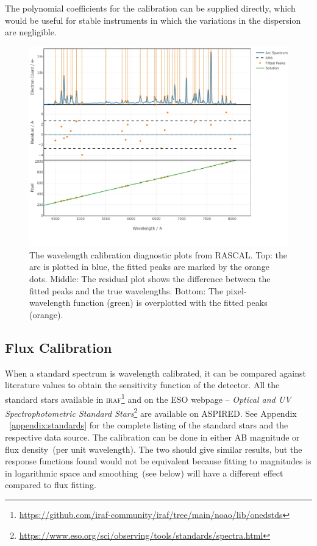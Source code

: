 \documentclass[fleqn,usenatbib]{mnras}
\begin{document}
The polynomial coefficients for the calibration can be supplied
directly, which would be useful for stable instruments in which
the variations in the dispersion are negligible.

\begin{figure}
    \centering
    \includegraphics[width=\columnwidth]{fig_05_wavelength_calibration_diagnostics.pdf}
    \caption{The wavelength calibration diagnostic plots from RASCAL.
    Top: the arc is plotted in blue, the fitted peaks are marked by
    the orange dots. Middle: The residual plot shows the difference
    between the fitted peaks and the true wavelengths. Bottom: The
    pixel-wavelength function (green) is overplotted with the fitted
    peaks (orange).}
    \label{fig:wavecal}
\end{figure}

\subsection{Flux Calibration}
When a standard spectrum is wavelength calibrated, it can be
compared against literature values to obtain the sensitivity
function of the detector. All the standard stars available in
\textsc{iraf}\footnote{\url{https://github.com/iraf-community/iraf/tree/main/noao/lib/onedstds}}
and on the ESO webpage -- \textit{Optical and UV Spectrophotometric
Standard Stars}\footnote{\url{https://www.eso.org/sci/observing/tools/standards/spectra.html}}
are available on \textsc{ASPIRED}. See Appendix ~\ref{appendix:standards} for
the complete listing of the standard stars and the respective data
source. The calibration can be done in either AB magnitude or
flux density~(per unit wavelength). The two should give similar
results, but the response functions found would not be equivalent
because fitting to magnitudes is in logarithmic space and smoothing~(see
below) will have a different effect compared to flux fitting.
\end{document}
